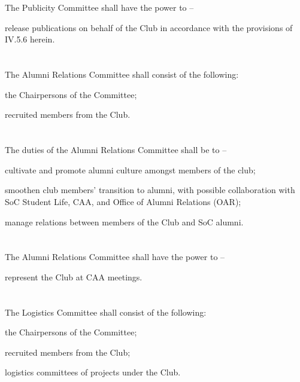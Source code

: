 \section{}
The Publicity Committee shall have the power to –
	\begin{legal}
	\item release publications on behalf of the Club in accordance with the provisions of IV.5.6 herein.
	\end{legal}

\section{}
The Alumni Relations Committee shall consist of the following:
	\begin{legal}
	\item the Chairpersons of the Committee;
	\item recruited members from the Club.
	\end{legal}

\section{}
The duties of the Alumni Relations Committee shall be to –
	\begin{legal}
	\item cultivate and promote alumni culture amongst members of the club;
	\item smoothen club members' transition to alumni, with possible collaboration with SoC Student Life, CAA, and Office of Alumni Relations (OAR);
	\item manage relations between members of the Club and SoC alumni.
	\end{legal}

\section{}
The Alumni Relations Committee shall have the power to –
	\begin{legal}
	\item represent the Club at CAA meetings.
	\end{legal}

\section{}
The Logistics Committee shall consist of the following:
	\begin{legal}
	\item the Chairpersons of the Committee;
	\item recruited members from the Club;
	\item logistics committees of projects under the Club.
	\end{legal}

